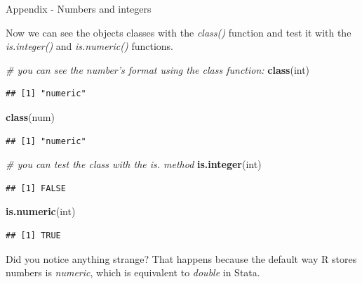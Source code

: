 \documentclass[ignorenonframetext,]{beamer}
\newenvironment{Shaded}{\begin{snugshade}}{\end{snugshade}}
\newcommand{\KeywordTok}[1]{\textcolor[rgb]{0.13,0.29,0.53}{\textbf{#1}}}
\newcommand{\CommentTok}[1]{\textcolor[rgb]{0.56,0.35,0.01}{\textit{#1}}}
\newcommand{\NormalTok}[1]{#1}
\begin{document}
\begin{frame}[fragile]{Appendix - Numbers and integers}

\begin{block}{Now we can see the objects classes with the \emph{class()}
function and test it with the \emph{is.integer()} and
\emph{is.numeric()} functions.}

\begin{Shaded}
\begin{Highlighting}[]
\CommentTok{# you can see the number's format using the class function:}
\KeywordTok{class}\NormalTok{(int)}
\end{Highlighting}
\end{Shaded}

\begin{verbatim}
## [1] "numeric"
\end{verbatim}

\begin{Shaded}
\begin{Highlighting}[]
\KeywordTok{class}\NormalTok{(num)}
\end{Highlighting}
\end{Shaded}

\begin{verbatim}
## [1] "numeric"
\end{verbatim}

\begin{Shaded}
\begin{Highlighting}[]
\CommentTok{# you can test the class with the is. method}
\KeywordTok{is.integer}\NormalTok{(int)}
\end{Highlighting}
\end{Shaded}

\begin{verbatim}
## [1] FALSE
\end{verbatim}

\begin{Shaded}
\begin{Highlighting}[]
\KeywordTok{is.numeric}\NormalTok{(int)}
\end{Highlighting}
\end{Shaded}

\begin{verbatim}
## [1] TRUE
\end{verbatim}

Did you notice anything strange? That happens because the default way R
stores numbers is \emph{numeric}, which is equivalent to \emph{double}
in Stata.

\end{block}

\end{frame}
\end{document}
